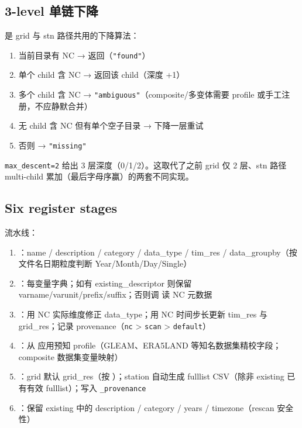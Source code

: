 \subsection{3-level 单链下降}

 是 grid 与 stn 路径共用的下降算法：

\begin{enumerate}
  \item 当前目录有 NC → 返回（\texttt{"found"}）
  \item 单个 child 含 NC → 返回该 child（深度 +1）
  \item 多个 child 含 NC → \texttt{"ambiguous"}（composite/多变体需要 profile 或手工注册，不应静默合并）
  \item 无 child 含 NC 但有单个空子目录 → 下降一层重试
  \item 否则 → \texttt{"missing"}
\end{enumerate}

\texttt{max\_descent=2} 给出 3 层深度（0/1/2）。这取代了之前 grid 仅 2 层、stn 路径 multi-child 累加（最后字母序赢）的两套不同实现。

\subsection{Six register stages}

 流水线：

\begin{enumerate}
  \item {}：name / description / category / data\_type / tim\_res / data\_groupby（按文件名日期粒度判断 Year/Month/Day/Single）
  \item {}：每变量字典；如有 existing\_descriptor 则保留 varname/varunit/prefix/suffix；否则调  读 NC 元数据
  \item {}：用 NC 实际维度修正 data\_type；用 NC 时间步长更新 tim\_res 与 grid\_res；记录 provenance（\texttt{nc} > \texttt{scan} > \texttt{default}）
  \item {}：从  应用预知 profile（GLEAM、ERA5LAND 等知名数据集精校字段；composite 数据集变量映射）
  \item {}：grid 默认 grid\_res（按 ）；station 自动生成 fulllist CSV（除非 existing 已有有效 fulllist）；写入 \texttt{\_provenance}
  \item {}：保留 existing 中的 description / category / years / timezone（rescan 安全性）
\end{enumerate}

